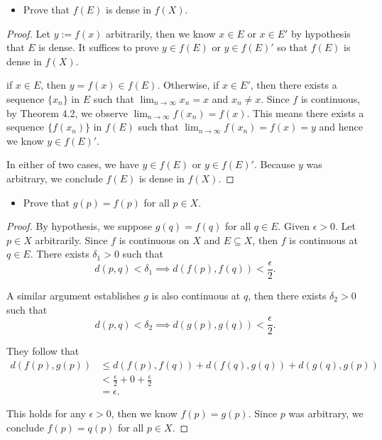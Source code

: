 \begin{Exercise}
	\begin{itemize}
		\item Prove that $f(E)$ is dense in $f(X)$.
	\end{itemize}
	\begin{proof}
		Let $y := f(x)$ arbitrarily, then we know $x\in E$ or $x\in E'$ by hypothesis that $E$ is dense. It suffices to prove $y\in f(E)$ or $y\in f(E)'$ so that $f(E)$ is dense in $f(X)$.
		
		if $x\in E$, then $y=f(x)\in f(E)$. Otherwise, if $x\in E'$, then there exists a sequence $\{x_n\}$ in $E$ such that $\lim_{n\to\infty} x_n = x$ and $x_n \neq x$. Since $f$ is continuous, by Theorem 4.2, we observe $\lim_{n\to\infty} f(x_n) = f(x)$. This means there exists a sequence $\{f(x_n)\}$ in $f(E)$ such that $\lim_{n\to\infty} f(x_n) = f(x) = y$ and hence we know $y\in f(E)'$.
		
		In either of two cases, we have $y\in f(E)$ or $y\in f(E)'$. Because $y$ was arbitrary, we conclude $f(E)$ is dense in $f(X)$.
	\end{proof}
	
	\begin{itemize}
		\item Prove that $g(p) = f(p)$ for all $p\in X$.
	\end{itemize}
	\begin{proof}
		By hypothesis, we suppose $g(q) = f(q)$ for all $q\in E$. Given $\epsilon>0$. Let $p\in X$ arbitrarily. Since $f$ is continuous on $X$ and $E\subseteq X$, then $f$ is continuous at $q\in E$. There exists $\delta_1>0$ such that
		$$
		d(p,q)<\delta_1 \implies d(f(p),f(q))<\frac{\epsilon}{2}.
		$$
		
		A similar argument establishes $g$ is also continuous at $q$, then there exists $\delta_2>0$ such that
		$$
		d(p,q)<\delta_2 \implies d(g(p),g(q))<\frac{\epsilon}{2}.
		$$
		
		They follow that
		\begin{align*}
		d(f(p),g(p))
		&\leq d(f(p), f(q)) + d(f(q), g(q)) + d(g(q), g(p)) \\
		&< \frac{\epsilon}{2} + 0 + \frac{\epsilon}{2} \\
		&= \epsilon.
		\end{align*}
		
		This holds for any $\epsilon>0$, then we know $f(p)=g(p)$. Since $p$ was arbitrary, we conclude $f(p)=q(p)$ for all $p\in X$.
	\end{proof}
\end{Exercise}